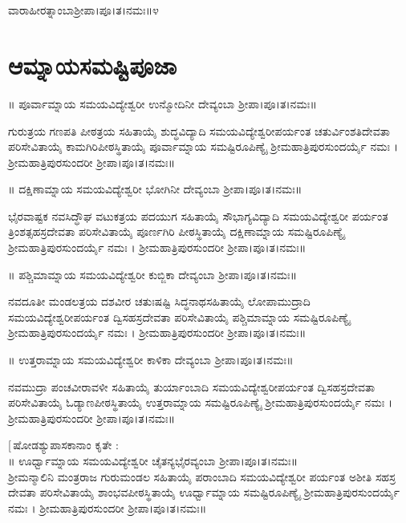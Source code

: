 \\
\\
ವಾರಾಹೀರತ್ನಾಂಬಾಶ್ರೀಪಾ।ಪೂ।ತ।ನಮಃ॥೪
\section{ಆಮ್ನಾಯಸಮಷ್ಟಿಪೂಜಾ}
॥ ಪೂರ್ವಾಮ್ನಾಯ ಸಮಯವಿದ್ಯೇಶ್ವರೀ ಉನ್ಮೋದಿನೀ ದೇವ್ಯಂಬಾ ಶ್ರೀಪಾ।ಪೂ।ತ।ನಮಃ॥

ಗುರುತ್ರಯ ಗಣಪತಿ ಪೀಠತ್ರಯ ಸಹಿತಾಯೈ ಶುದ್ಧವಿದ್ಯಾದಿ ಸಮಯವಿದ್ಯೇಶ್ವರೀಪರ್ಯಂತ ಚತುರ್ವಿಂಶತಿದೇವತಾ ಪರಿಸೇವಿತಾಯೈ ಕಾಮಗಿರಿಪೀಠಸ್ಥಿತಾಯೈ  ಪೂರ್ವಾಮ್ನಾಯ ಸಮಷ್ಟಿರೂಪಿಣ್ಯೈ ಶ್ರೀಮಹಾತ್ರಿಪುರಸುಂದರ್ಯೈ ನಮಃ । ಶ್ರೀಮಹಾತ್ರಿಪುರಸುಂದರೀ ಶ್ರೀಪಾ।ಪೂ।ತ।ನಮಃ॥

॥ ದಕ್ಷಿಣಾಮ್ನಾಯ ಸಮಯವಿದ್ಯೇಶ್ವರೀ ಭೋಗಿನೀ ದೇವ್ಯಂಬಾ ಶ್ರೀಪಾ।ಪೂ।ತ।ನಮಃ॥

ಭೈರವಾಷ್ಟಕ ನವಸಿದ್ಧೌಘ ವಟುಕತ್ರಯ ಪದಯುಗ ಸಹಿತಾಯೈ ಸೌಭಾಗ್ಯವಿದ್ಯಾದಿ ಸಮಯವಿದ್ಯೇಶ್ವರೀ ಪರ್ಯಂತ ತ್ರಿಂಶತ್ಸಹಸ್ರದೇವತಾ ಪರಿಸೇವಿತಾಯೈ ಪೂರ್ಣಗಿರಿ ಪೀಠಸ್ಥಿತಾಯೈ ದಕ್ಷಿಣಾಮ್ನಾಯ ಸಮಷ್ಟಿರೂಪಿಣ್ಯೈ ಶ್ರೀಮಹಾತ್ರಿಪುರಸುಂದರ್ಯೈ ನಮಃ । ಶ್ರೀಮಹಾತ್ರಿಪುರಸುಂದರೀ ಶ್ರೀಪಾ।ಪೂ।ತ।ನಮಃ॥

॥ ಪಶ್ಚಿಮಾಮ್ನಾಯ ಸಮಯವಿದ್ಯೇಶ್ವರೀ ಕುಬ್ಜಿಕಾ ದೇವ್ಯಂಬಾ ಶ್ರೀಪಾ।ಪೂ।ತ।ನಮಃ॥

ನವದೂತೀ ಮಂಡಲತ್ರಯ ದಶವೀರ ಚತುಃಷಷ್ಟಿ ಸಿದ್ಧನಾಥಸಹಿತಾಯೈ ಲೋಪಾಮುದ್ರಾದಿ ಸಮಯವಿದ್ಯೇಶ್ವರೀಪರ್ಯಂತ ದ್ವಿಸಹಸ್ರದೇವತಾ ಪರಿಸೇವಿತಾಯೈ ಪಶ್ಚಿಮಾಮ್ನಾಯ ಸಮಷ್ಟಿರೂಪಿಣ್ಯೈ ಶ್ರೀಮಹಾತ್ರಿಪುರಸುಂದರ್ಯೈ ನಮಃ । ಶ್ರೀಮಹಾತ್ರಿಪುರಸುಂದರೀ ಶ್ರೀಪಾ।ಪೂ।ತ।ನಮಃ॥

॥ ಉತ್ತರಾಮ್ನಾಯ ಸಮಯವಿದ್ಯೇಶ್ವರೀ ಕಾಳಿಕಾ ದೇವ್ಯಂಬಾ ಶ್ರೀಪಾ।ಪೂ।ತ।ನಮಃ॥

ನವಮುದ್ರಾ ಪಂಚವೀರಾವಳೀ ಸಹಿತಾಯೈ ತುರ್ಯಾಂಬಾದಿ ಸಮಯವಿದ್ಯೇಶ್ವರೀಪರ್ಯಂತ ದ್ವಿಸಹಸ್ರದೇವತಾ ಪರಿಸೇವಿತಾಯೈ ಓಡ್ಯಾಣಪೀಠಸ್ಥಿತಾಯೈ ಉತ್ತರಾಮ್ನಾಯ ಸಮಷ್ಟಿರೂಪಿಣ್ಯೈ ಶ್ರೀಮಹಾತ್ರಿಪುರಸುಂದರ್ಯೈ ನಮಃ । ಶ್ರೀಮಹಾತ್ರಿಪುರಸುಂದರೀ ಶ್ರೀಪಾ।ಪೂ।ತ।ನಮಃ॥

 [\,ಷೋಡಶ್ಯುಪಾಸಕಾನಾಂ ಕೃತೇ :\\
 ॥ ಊರ್ಧ್ವಾಮ್ನಾಯ ಸಮಯವಿದ್ಯೇಶ್ವರೀ ಚೈತನ್ಯಭೈರವ್ಯಂಬಾ ಶ್ರೀಪಾ।ಪೂ।ತ।ನಮಃ॥\\
ಶ್ರೀಮನ್ಮಾಲಿನಿ ಮಂತ್ರರಾಜ ಗುರುಮಂಡಲ ಸಹಿತಾಯೈ ಪರಾಂಬಾದಿ ಸಮಯವಿದ್ಯೇಶ್ವರೀ ಪರ್ಯಂತ ಅಶೀತಿ ಸಹಸ್ರ ದೇವತಾ ಪರಿಸೇವಿತಾಯೈ ಶಾಂಭವಪೀಠಸ್ಥಿತಾಯೈ ಊರ್ಧ್ವಾಮ್ನಾಯ ಸಮಷ್ಟಿರೂಪಿಣ್ಯೈ ಶ್ರೀಮಹಾತ್ರಿಪುರಸುಂದರ್ಯೈ ನಮಃ । ಶ್ರೀಮಹಾತ್ರಿಪುರಸುಂದರೀ ಶ್ರೀಪಾ।ಪೂ।ತ।ನಮಃ॥

